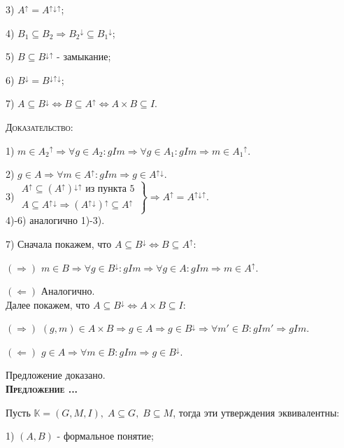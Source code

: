 \documentclass[18pt, a4paper]{extarticle}
\newcounter{par}
\newcounter{spar}
\newcounter{zap}
\newcommand{\predl}{\textbf{\textsc{Предложение \thepar.\if\thespar1\thespar.\fi\thezap.\;}}\stepcounter{zap}}
\newcommand{\dok}{\textsc{Доказательство:}}
\newcommand{\rightdok}{\boxed{(\Rightarrow)}}
\newcommand{\leftdok}{\boxed{(\Leftarrow)}}
\newcommand{\galoisup}{{^\uparrow}}
\newcommand{\galoisdown}{{^\downarrow}}
\begin{document}
3) $A\galoisup=A\galoisup\galoisdown\galoisup$;

4) $B_1\subseteq B_2\Rightarrow B_2\galoisdown\subseteq B_1\galoisdown$;

5) $B\subseteq B\galoisdown\galoisup$ - замыкание;

6) $B\galoisdown=B\galoisdown\galoisup\galoisdown$;

7) $A\subseteq B\galoisdown\Leftrightarrow B\subseteq A\galoisup\Leftrightarrow A\times B\subseteq I$.

\dok

1) $m\in A_2\galoisup\Rightarrow\forall g\in A_2:gIm\Rightarrow\forall g\in A_1:gIm\Rightarrow m\in A_1\galoisup$.

2) $g\in A\Rightarrow\forall m\in A\galoisup:gIm\Rightarrow g\in A\galoisup\galoisdown$.\\

3) $\left.
  \begin{array}{c}
    A\galoisup\subseteq (A\galoisup)\galoisdown\galoisup\text{ из пункта 5} \\
    A\subseteq A\galoisup\galoisdown\Rightarrow (A\galoisup\galoisdown)\galoisup\subseteq A\galoisup
  \end{array}
  \right\}\Rightarrow A\galoisup=A\galoisup\galoisdown\galoisup$.\\

4)-6) аналогично 1)-3).

7) Сначала покажем, что $A\subseteq B\galoisdown\Leftrightarrow B\subseteq A\galoisup$:

$\rightdok$ $m\in B\Rightarrow\forall g\in B\galoisdown:gIm\Rightarrow\forall g\in A:gIm\Rightarrow m\in A\galoisup$.

$\leftdok$ Аналогично.\\

Далее покажем, что $A\subseteq B\galoisdown\Leftrightarrow A\times B\subseteq I$:

$\rightdok$ $(g,m)\in A\times B\Rightarrow g\in A\Rightarrow g\in B\galoisdown\Rightarrow\forall m'\in B:gIm'\Rightarrow gIm$.

$\leftdok$ $g\in A\Rightarrow\forall m\in B: gIm\Rightarrow g\in B\galoisdown$.

Предложение доказано.\\

\predl

Пусть $\mathbb{K}=(G,M,I),\;A\subseteq G,\;B\subseteq M$, тогда эти утверждения эквивалентны:

1) $(A,B)$ - формальное понятие;
\end{document}
